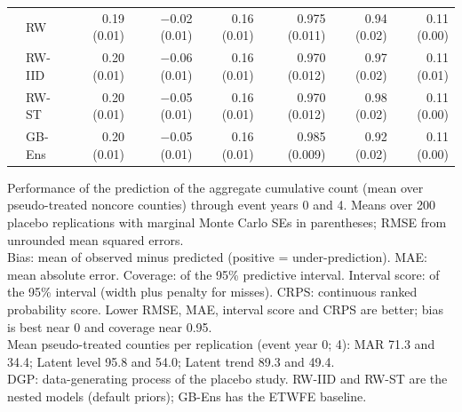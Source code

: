 \begin{table}
\begin{tabular*}{1\linewidth}{@{\extracolsep{\fill}}llrrrrrr}
 & RW & 0.19 (0.01) & −0.02 (0.01) & 0.16 (0.01) & 0.975 (0.011) & 0.94 (0.02) & 0.11 (0.00) \\ 
 & RW-IID & 0.20 (0.01) & −0.06 (0.01) & 0.16 (0.01) & 0.970 (0.012) & 0.97 (0.02) & 0.11 (0.01) \\ 
 & RW-ST & 0.20 (0.01) & −0.05 (0.01) & 0.16 (0.01) & 0.970 (0.012) & 0.98 (0.02) & 0.11 (0.00) \\ 
 & GB-Ens & 0.20 (0.01) & −0.05 (0.01) & 0.16 (0.01) & 0.985 (0.009) & 0.92 (0.02) & 0.11 (0.00) \\ 
\bottomrule
\end{tabular*}
\begin{minipage}{\linewidth}
\vspace{.05em}
Performance of the prediction of the aggregate cumulative count (mean over pseudo-treated noncore counties) through event years 0 and 4. Means over 200 placebo replications with marginal Monte Carlo SEs in parentheses; RMSE from unrounded mean squared errors.\\
Bias: mean of observed minus predicted (positive = under-prediction). MAE: mean absolute error. Coverage: of the 95\% predictive interval. Interval score: of the 95\% interval (width plus penalty for misses). CRPS: continuous ranked probability score. Lower RMSE, MAE, interval score and CRPS are better; bias is best near 0 and coverage near 0.95.\\
Mean pseudo-treated counties per replication (event year 0; 4): MAR 71.3 and 34.4; Latent level 95.8 and 54.0; Latent trend 89.3 and 49.4.\\
DGP: data-generating process of the placebo study. RW-IID and RW-ST are the nested models (default priors); GB-Ens has the ETWFE baseline.\\
\end{minipage}
\end{table}


